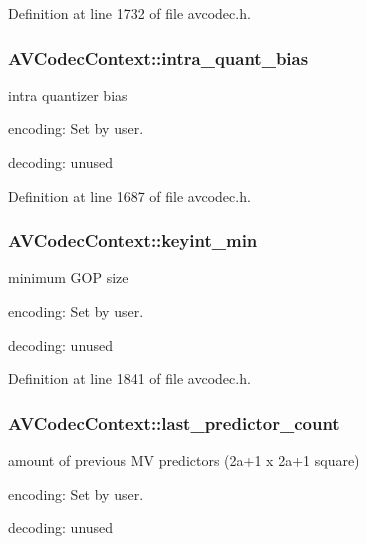 Definition at line 1732 of file avcodec.\+h.

\subsubsection[{\texorpdfstring{intra\+\_\+quant\+\_\+bias}{intra_quant_bias}}]{ A\+V\+Codec\+Context\+::intra\+\_\+quant\+\_\+bias}\hypertarget{struct_a_v_codec_context_acb4a8098f06ceed349a7a9f2eb1c4ee1}{}\label{struct_a_v_codec_context_acb4a8098f06ceed349a7a9f2eb1c4ee1}
intra quantizer bias
\begin{DoxyItemize}
\item encoding\+: Set by user.
\item decoding\+: unused 
\end{DoxyItemize}

Definition at line 1687 of file avcodec.\+h.

\subsubsection[{\texorpdfstring{keyint\+\_\+min}{keyint_min}}]{ A\+V\+Codec\+Context\+::keyint\+\_\+min}\hypertarget{struct_a_v_codec_context_a3f920af17b8b15cc9d9465ecb732afcb}{}\label{struct_a_v_codec_context_a3f920af17b8b15cc9d9465ecb732afcb}
minimum G\+OP size
\begin{DoxyItemize}
\item encoding\+: Set by user.
\item decoding\+: unused 
\end{DoxyItemize}

Definition at line 1841 of file avcodec.\+h.

\subsubsection[{\texorpdfstring{last\+\_\+predictor\+\_\+count}{last_predictor_count}}]{ A\+V\+Codec\+Context\+::last\+\_\+predictor\+\_\+count}\hypertarget{struct_a_v_codec_context_a7ca6bf3e2949e617cac66498779e6103}{}\label{struct_a_v_codec_context_a7ca6bf3e2949e617cac66498779e6103}
amount of previous MV predictors (2a+1 x 2a+1 square)
\begin{DoxyItemize}
\item encoding\+: Set by user.
\item decoding\+: unused 
\end{DoxyItemize}

